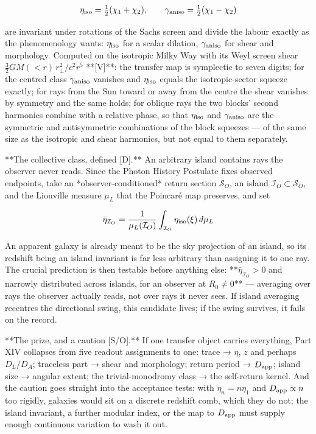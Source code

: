 $$\eta_{\rm iso} = \tfrac12(\chi_1+\chi_2),\qquad \gamma_{\rm aniso} = \tfrac12(\chi_1-\chi_2)$$

are invariant under rotations of the Sachs screen and divide the labour exactly as the phenomenology wants: $\eta_{\rm iso}$ for a scalar dilation, $\gamma_{\rm aniso}$ for shear and morphology. Computed on the isotropic Milky Way with its Weyl screen shear $\tfrac32GM(<r)\,r_\perp^2/c^2r^5$ **[V]**: the transfer map is symplectic to seven digits; for the centred class $\gamma_{\rm aniso}$ vanishes and $\eta_{\rm iso}$ equals the isotropic-sector squeeze exactly; for rays from the Sun toward or away from the centre the shear vanishes by symmetry and the same holds; for oblique rays the two blocks' second harmonics combine with a relative phase, so that $\eta_{\rm iso}$ and $\gamma_{\rm aniso}$ are the symmetric and antisymmetric combinations of the block squeezes — of the same size as the isotropic and shear harmonics, but not equal to them separately.

**The collective class, defined [D].** An arbitrary island contains rays the observer never reads. Since the Photon History Postulate fixes observed endpoints, take an *observer-conditioned* return section $\mathcal S_O$, an island $\mathcal I_O\subset\mathcal S_O$, and the Liouville measure $\mu_L$ that the Poincaré map preserves, and set

$$\bar\eta_{\mathcal I_O} = \frac{1}{\mu_L(\mathcal I_O)}\int_{\mathcal I_O}\eta_{\rm iso}(\xi)\,d\mu_L$$

An apparent galaxy is already meant to be the sky projection of an island, so its redshift being an island invariant is far less arbitrary than assigning it to one ray. The crucial prediction is then testable before anything else: **$\bar\eta_{\mathcal I_O} > 0$ and narrowly distributed across islands, for an observer at $R_0\neq0$** — averaging over rays the observer actually reads, not over rays it never sees. If island averaging recentres the directional swing, this candidate lives; if the swing survives, it fails on the record.

**The prize, and a caution [S/O].** If one transfer object carries everything, Part XIV collapses from five readout assignments to one: trace → $\eta$, $z$ and perhaps $D_L/D_A$; traceless part → shear and morphology; return period → $D_{\rm app}$; island size → angular extent; the trivial-monodromy class → the self-return kernel. And the caution goes straight into the acceptance tests: with $\eta_n = n\eta_1$ and $D_{\rm app}\propto n$ too rigidly, galaxies would sit on a discrete redshift comb, which they do not; the island invariant, a further modular index, or the map to $D_{\rm app}$ must supply enough continuous variation to wash it out.

